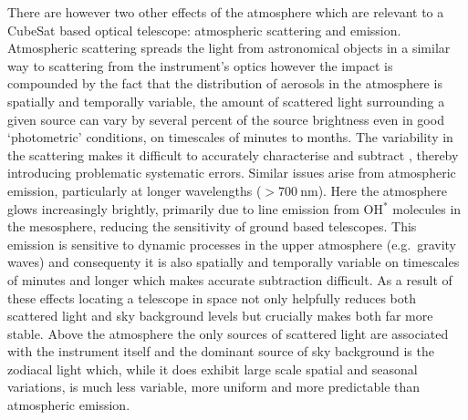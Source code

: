 \documentclass[]{iac}
\begin{document}
There are however two other effects of the atmosphere which are relevant to a CubeSat based optical telescope:
atmospheric scattering and emission.  Atmospheric scattering spreads the light from astronomical objects in a similar
way to scattering from the instrument's optics however the impact is compounded by the fact that the distribution of
aerosols in the atmosphere is spatially and temporally variable, the amount of scattered light surrounding a given
source can vary by several percent of the source brightness even in good `photometric' conditions, on timescales of
minutes to months. The variability in the scattering makes it difficult to accurately characterise and subtract
\cite{McGraw2010}, thereby introducing problematic systematic errors.  Similar issues arise from atmospheric emission,
particularly at longer wavelengths ($>\SI{700}{\nano\metre}$). Here the atmosphere glows increasingly brightly,
primarily due to line emission from OH$^*$ molecules in the mesosphere, reducing the sensitivity of ground based
telescopes. This emission is sensitive to dynamic processes in the upper atmosphere (e.g.\ gravity waves) and
consequenty it is also spatially and temporally variable on timescales of minutes and longer \cite{Moreels2008} which
makes accurate subtraction difficult.  As a result of these effects locating a telescope in space not only helpfully
reduces both scattered light and sky background levels but crucially makes both far more stable.  Above the atmosphere
the only sources of scattered light are associated with the instrument itself and the dominant source of sky background
is the zodiacal light \cite{Leinert1998} which, while it does exhibit large scale spatial and seasonal variations, is
much less variable, more uniform and more predictable than atmospheric emission.
\end{document}
